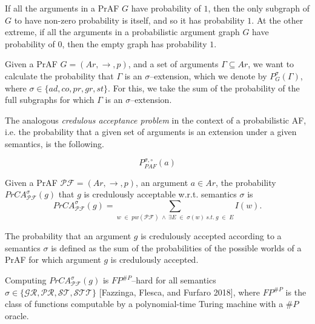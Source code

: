If all the arguments in a PrAF $G$ have probability of $1$, 
then the only subgraph of $G$ to have non-zero probability is itself, 
and so it has probability $1$. 
% 
At the other extreme,
if all the arguments in a probabilistic argument graph $G$ have probability of $0$, 
then the empty graph has probability $1$.








\vspace{3em}


Given a PrAF  $G = (Ar,\to,p)$, 
and a set of arguments $\Gamma \subseteq Ar$, 
we want to calculate the probability that $\Gamma$ is an $\sigma$--extension, 
which we denote by $P^\sigma_G(\Gamma)$,
where $\sigma \in \{ad, co, pr, gr, st\}$. 
For this, we take the sum of the probability of the full subgraphs for which $\Gamma$ is an $\sigma$--extension.



The analogous \textit{credulous acceptance problem} in the context of a probabilistic AF, 
i.e. the probability that a given set of arguments is an extension under a given semantics, is the following.


\[
    P_{PAF}^{\sigma,\circ} (a)
\]







\begin{df}
    Given a PrAF $\mathcal{PF}=(Ar,\to,p)$, 
    an argument $a \in Ar$, 
    the probability $PrCA^\sigma_\mathcal{PF}(g)$ that $g$ is credulously acceptable w.r.t. semantics $\sigma$ is 
    \[
        PrCA^\sigma_\mathcal{PF}(g)
            = 
        \sum_{w \;\in\; pw(\mathcal{PF}) ~\land~ \exists E \;\in\; \sigma(w) ~s.t.~  g\; \in\; E} I(w).
    \]
\end{df}


The probability that an argument $g$ is credulously accepted according to a semantics $\sigma$ is defined as the sum of the probabilities of the possible worlds  of a PrAF for which argument $g$ is credulously accepted.





Computing $PrCA^\sigma_\mathcal{PF}(g)$ is $FP^{\#P}$--hard for all semantics $\sigma \in \{\mathcal{GR,PR,ST},\mathcal{STT}\}$ [Fazzinga, Flesca, and Furfaro 2018], 
where $FP^{\#P}$ is the class of functions computable by a polynomial-time Turing machine with a $\#P$ oracle.






